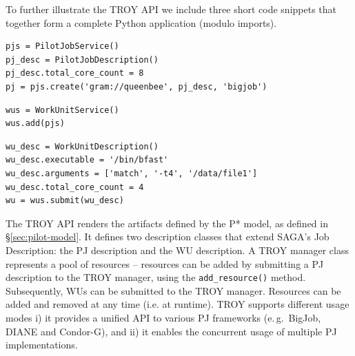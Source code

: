\documentclass[conference,final]{IEEEtran}
\begin{document}
To further illustrate the TROY API we include three short code snippets that 
together form a complete Python application (modulo imports).

\noindent\begin{minipage}{0.47 \textwidth}
\begin{lstlisting}
pjs = PilotJobService()
pj_desc = PilotJobDescription()
pj_desc.total_core_count = 8
pj = pjs.create('gram://queenbee', pj_desc, 'bigjob')
\end{lstlisting}
\end{minipage}

\noindent\begin{minipage}{0.47 \textwidth}
\begin{lstlisting}
wus = WorkUnitService()
wus.add(pjs)
\end{lstlisting}
\end{minipage}

\noindent\begin{minipage}{0.47 \textwidth}
\begin{lstlisting}
wu_desc = WorkUnitDescription()
wu_desc.executable = '/bin/bfast'
wu_desc.arguments = ['match', '-t4', '/data/file1']
wu_desc.total_core_count = 4
wu = wus.submit(wu_desc)
\end{lstlisting}
\end{minipage}

The TROY API renders the artifacts defined by the P* model, as defined in
\S\ref{sec:pilot-model}. It defines two description classes that extend SAGA's
Job Description: the PJ description and the WU description. A TROY manager class
represents a pool of resources -- resources can be added by submitting a PJ
description to the TROY manager, using the \texttt{add\_resource()} method.
Subsequently, WUs can be submitted to the TROY manager. Resources can be added
and removed at any time (i.e. at runtime). TROY supports different usage modes
i) it provides a unified API to various PJ frameworks (e.\,g.\ BigJob,
DIANE and Condor-G), and ii) it enables the concurrent usage of multiple PJ
implementations. 
\end{document}
